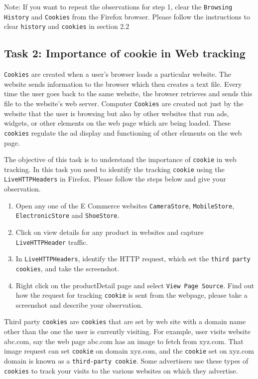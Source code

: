 Note: If you want to repeat the observations for step 1, clear the {\tt Browsing History} and {\tt Cookies} from the Firefox browser.
Please follow the instructions to clear {\tt history} and {\tt cookies} in section 2.2

\subsection{Task 2: Importance of cookie in Web tracking}

{\tt Cookies} are created when a user's browser loads a particular website. The website sends information to the browser which then creates a text file. 
Every time the user goes back to the same website, the browser retrieves and sends this file to the website's web server. 
Computer {\tt Cookies} are created not just by the website that the user is browsing but also by other websites that run ads, widgets, or other elements on the web page which are being loaded. 
These {\tt cookies} regulate the ad display and functioning of other elements on the web page.

The objective of this task is to understand the importance of {\tt cookie} in web tracking. 
In this task you need to identify the tracking {\tt cookie} using the {\tt LiveHTTPHeaders} in Firefox. 
Please follow the steps below and give your observation.

\begin{enumerate}
  \item Open any one of the E Commerce websites {\tt CameraStore}, {\tt MobileStore}, {\tt ElectronicStore} and {\tt ShoeStore}.
  \item Click on view details for any product in websites and capture {\tt LiveHTTPHeader} traffic.
  \item In {\tt LiveHTTPHeaders}, identify the HTTP request, which set the {\tt third party cookies}, and take the screenshot.
  \item Right click on the productDetail page and select {\tt View Page Source}. Find out how the request for tracking {\tt cookie} is sent from the webpage, please take a screenshot and describe your observation.
\end{enumerate}

Third party {\tt cookies} are {\tt cookies} that are set by web site with a domain name other than the one the user is currently visiting. 
For example, user visits website abc.com, say the web page abc.com has an image to fetch from xyz.com. 
That image request can set {\tt cookie} on domain xyz.com, and the {\tt cookie} set on xyz.com domain is known as a {\tt third-party cookie}. 
Some advertisers use these types of {\tt cookies} to track your visits to the various websites on which they advertise.

